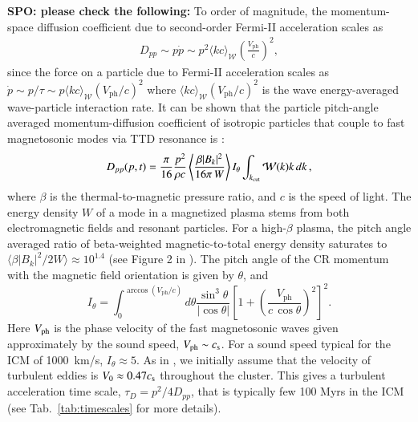 \documentclass[fleqn,usenatbib,useAMS]{mnras}
\newcommand{\Vph}{V_\mathrm{ph}}
\def\SPO#1{{\bf {\color{red} SPO: #1}}}
\begin{document}
\SPO{please check the following:} To order of magnitude, the
momentum-space diffusion coefficient due to second-order Fermi-II
acceleration scales as
\begin{eqnarray}
  D_{pp} \sim p\dot{p}
  \sim p^2\langle kc\rangle_{\mathcal{W}} \left(\frac{\Vph}{c}\right)^2,
\label{eq:dpp_oom}
\end{eqnarray}
since the force on a particle due to Fermi-II acceleration scales as
$\dot{p}\sim p/\tau\sim p \langle kc\rangle_{\mathcal{W}} (\Vph/c)^2$
where $\langle kc\rangle_{\mathcal{W}} (\Vph/c)^2$ is the wave
energy-averaged wave-particle interaction rate. It can be shown that
the particle pitch-angle averaged momentum-diffusion coefficient of
isotropic particles that couple to fast magnetosonic modes via TTD
resonance is \citep[][ Eqn. 47]{brunetti07}:
\begin{eqnarray}
  D_{pp}(p,t) = \frac{\pi}{16} \frac{p^2}{\rho c}
  \left\langle\frac{\beta |B_k|^2}{16 \pi \,W}\right\rangle
  I_\theta
  \int_{k_{\mathrm{cut}}}\mathcal{W}(k)k\,d k\,,
\label{eq:dpp}
\end{eqnarray}
where $\beta$ is the thermal-to-magnetic pressure ratio, and $c$
is the speed of light. The energy density $W$ of a mode in a
magnetized plasma stems from both electromagnetic fields and resonant
particles. For a high-$\beta$ plasma, the pitch angle averaged ratio of
beta-weighted magnetic-to-total energy density saturates to $\langle\beta
|B_k|^2/2W\rangle\approx 10^{1.4}$ (see Figure 2 in
\citealt{brunetti07}). The pitch angle of the CR momentum with the
magnetic field orientation is given by $\theta$, and
\begin{equation}
  \label{eq:I_theta}
  I_\theta=\int_0^{\arccos(\Vph/c)} d\theta {\frac{ \sin^3 \theta }{
    |\cos \theta | }}
\left[1+\left(\frac{\Vph}{c\,\cos{\theta}}\right)^2\right]^2.
\end{equation}
Here $V_{\mathrm{ph}}$ is the phase velocity of the fast magnetosonic waves
given approximately by the sound speed, $\Vph \sim c_\rmn{s}$. For a
sound speed typical for the ICM of 1000~km/s, $I_\theta\approx5$. As
in \cite{brunetti07}, we initially assume that the velocity of
turbulent eddies is $V_0\approx 0.47 c_{\mathrm{s}}$ throughout the
cluster. This gives a turbulent acceleration time scale, $\tau_{D} =
p^2/4D_{pp}$, that is typically few 100 Myrs in the ICM (see
Tab.~\ref{tab:timescales} for more details).
\end{document}
